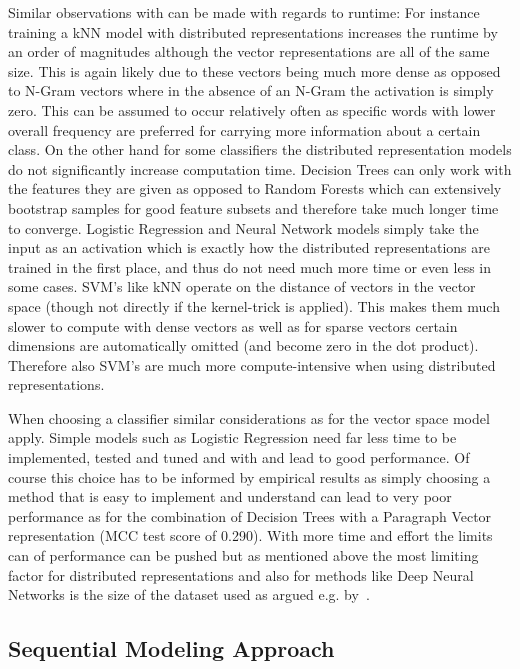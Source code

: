 Similar observations with can be made with regards to runtime: For instance training a \gls{kNN} model with distributed representations increases the runtime by an order of magnitudes although the vector representations are all of the same size. This is again likely due to these vectors being much more dense as opposed to N-Gram vectors where in the absence of an N-Gram the activation is simply zero. This can be assumed to occur relatively often as specific words with lower overall frequency are preferred for carrying more information about a certain class.
On the other hand for some classifiers the distributed representation models do not significantly increase computation time. Decision Trees can only work with the features they are given as opposed to Random Forests which can extensively bootstrap samples for good feature subsets and therefore take much longer time to converge.
Logistic Regression and Neural Network models simply take the input as an activation which is exactly how the distributed representations are trained in the first place, and thus do not need much more time or even less in some cases. SVM's like \gls{kNN} operate on the distance of vectors in the vector space (though not directly if the kernel-trick is applied). This makes them much slower to compute with dense vectors as well as for sparse vectors certain dimensions are automatically omitted (and become zero in the dot product). Therefore also SVM's are much more compute-intensive when using distributed representations.

When choosing a classifier similar considerations as for the vector space model apply. Simple models such as Logistic Regression need far less time to be implemented, tested and tuned and with and lead to good performance. Of course this choice has to be informed by empirical results as simply choosing a method that is easy to implement and understand can lead to very poor performance as for the combination of Decision Trees with a Paragraph Vector representation (\gls{MCC} test score of 0.290). With more time and effort the limits can of performance can be pushed but as mentioned above the most limiting factor for distributed representations and also for methods like Deep Neural Networks is the size of the dataset used as argued e.g. by~\cite{Halevy:2009aa}.

\subsection{Sequential Modeling Approach}
\label{sub:Sequential Modeling Approach}

